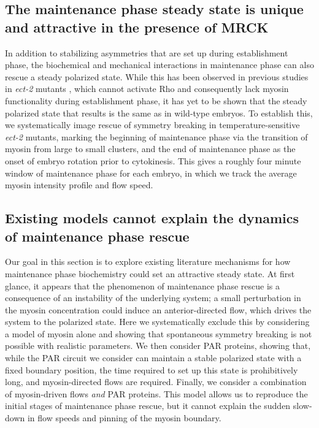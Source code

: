 \documentclass[11pt]{article}
\newcommand{\6}[1]{#1_{\text{6}}}
\newcommand{\3}[1]{#1_{\text{3}}}
\begin{document}
\subsection*{The maintenance phase steady state is unique and attractive in the presence of MRCK}
In addition to stabilizing asymmetries that are set up during establishment phase, the biochemical and mechanical interactions in maintenance phase can also rescue a steady polarized state. While this has been observed in previous studies  in \emph{ect-2} mutants \citep{zonies2010symmetry, tse2012rhoa}, which cannot activate Rho and consequently lack myosin functionality during establishment phase, it has yet to be shown that the steady polarized state that results is the same as in wild-type embryos. To establish this, we systematically image rescue of symmetry breaking in temperature-sensitive \emph{ect-2} mutants, marking the beginning of maintenance phase via the transition of myosin from large to small clusters, and the end of maintenance phase as the onset of embryo rotation prior to cytokinesis. This gives a roughly four minute window of maintenance phase for each embryo, in which we track the average myosin intensity profile and flow speed.

\subsection*{Existing models cannot explain the dynamics of maintenance phase rescue }
Our goal in this section is to explore existing literature mechanisms for how maintenance phase biochemistry could set an attractive steady state. At first glance, it appears that the phenomenon of maintenance phase rescue is a consequence of an instability of the underlying system; a small perturbation in the myosin concentration could induce an anterior-directed flow, which drives the system to the polarized state. Here we systematically exclude this by considering a model of myosin alone and showing that spontaneous symmetry breaking is not possible with realistic parameters. We then consider PAR proteins, showing that, while the PAR circuit we consider can maintain a stable polarized state with a fixed boundary position, the time required to set up this state is prohibitively long, and myosin-directed flows are required. Finally, we consider a combination of myosin-driven flows \emph{and} PAR proteins. This model allows us to reproduce the initial stages of maintenance phase rescue, but it cannot explain the sudden slow-down in flow speeds and pinning of the myosin boundary.
\end{document}
